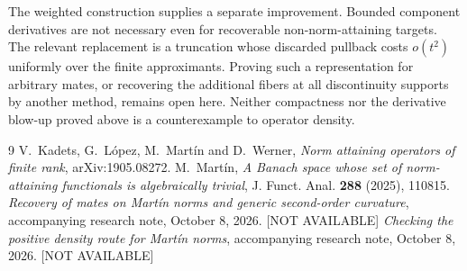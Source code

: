 \documentclass[10pt]{amsart}
\begin{document}
The weighted construction supplies a separate improvement.
Bounded component derivatives are not necessary even for
recoverable non-norm-attaining targets. The relevant replacement
is a truncation whose discarded pullback costs $o(t^2)$ uniformly
over the finite approximants. Proving such a representation for
arbitrary mates, or recovering the additional fibers at all
discontinuity supports by another method, remains open here.
Neither compactness nor the derivative blow-up proved above is
a counterexample to operator density.

\begin{thebibliography}{9}
V.~Kadets, G.~L\'opez, M.~Mart\'in and D.~Werner,
\emph{Norm attaining operators of finite rank}, arXiv:1905.08272.
M.~Mart\'in,
\emph{A Banach space whose set of norm-attaining functionals is
algebraically trivial}, J. Funct. Anal. \textbf{288} (2025), 110815.
\emph{Recovery of mates on Mart\'in norms and generic second-order
curvature}, accompanying research note, October 8, 2026. [NOT AVAILABLE]
\emph{Checking the positive density route for Mart\'in norms},
accompanying research note, October 8, 2026. [NOT AVAILABLE]
\end{thebibliography}
\end{document}
